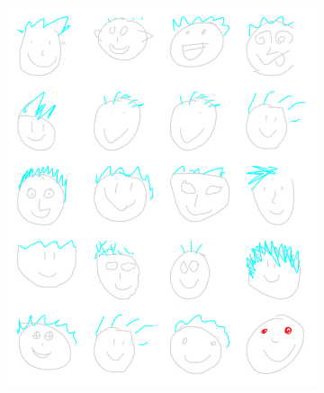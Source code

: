 \begin{figure}[!htb]
\begin{subfigure}{.5\textwidth}
\centering
\includegraphics[width=0.9\linewidth]{data_collection/summary/spikyface.png}  
\end{subfigure}
\hspace{5mm}
\begin{subfigure}{.5\textwidth}
\centering

\end{subfigure}
\end{figure}
